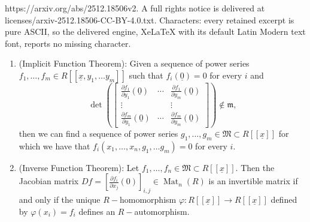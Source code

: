 \documentclass[10pt,a4paper]{amsart}
\DeclareMathOperator{\Mat}{Mat}
\begin{document}
https://arxiv.org/abs/2512.18506v2. A full rights notice is delivered at licenses/arxiv-2512.18506-CC-BY-4.0.txt. Characters: every retained excerpt is pure ASCII, so the delivered engine, XeLaTeX with its default Latin Modern text font, reports no missing character.
\begin{lemma}\label{lem:W[[x]]_good_prop}
\begin{enumerate}
    \item \textup{(Implicit Function Theorem)}: Given a sequence of power series $f_1, \dots, f_m \in R[[\underline{x},y_1, \dots y_m]]$ such that $f_i(\underline{0})=0$ for every $i$ and 
    \begin{equation*}
    \det \left(
        \begin{bmatrix}
            \frac{\partial f_1}{\partial y_1}(\underline{0}) & \cdots & \frac{\partial f_1}{\partial y_m}(\underline{0})\\
            \vdots & & \vdots \\
            \frac{\partial f_m}{\partial y_1}(\underline{0}) & \cdots & \frac{\partial f_m}{\partial y_m}(\underline{0})
        \end{bmatrix}
        \right) \notin \mathfrak{m},
    \end{equation*}
    then we can find a sequence of power series $g_1, \dots, g_m \in \mathfrak{M} \subset R[[\underline{x}]]$ for which we have that $f_i\left(x_1, \dots, x_n, g_1, \dots g_m\right)=0$ for every $i$. 
    \item \textup{(Inverse Function Theorem)}: Let $f_1, \dots, f_n \in \mathfrak{M} \subset R[[\underline{x}]]$. Then the  Jacobian matrix $Df=\left[\frac{\partial f_i}{\partial x_j}\left(0\right)\right]_{i,j} \in \Mat_n\left(R\right)$ is an invertible matrix if and only if the unique $R-$homomorphism $\varphi \colon R[[\underline{x}]] \to R[[\underline{x}]]$ defined by $\varphi\left(x_i\right)=f_i$ defines an $R-$automorphism. 
\end{enumerate}
\end{lemma}
\end{document}
